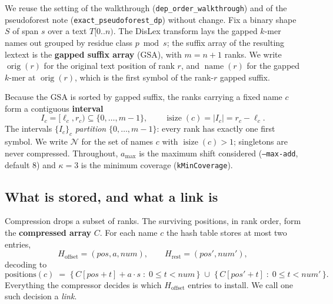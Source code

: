 \documentclass[11pt,a4paper]{article}
\theoremstyle{definition}
\theoremstyle{plain}
\theoremstyle{remark}
\newcommand{\orig}{\operatorname{orig}}
\newcommand{\name}{\operatorname{name}}
\newcommand{\isize}{\operatorname{isize}}
\newcommand{\Names}{\mathcal{N}}
\begin{document}
We reuse the setting of the walkthrough (\texttt{dep\_order\_walkthrough})
and of the pseudoforest note (\texttt{exact\_pseudoforest\_dp}) without
change. Fix a binary shape $S$ of span $s$ over a text $T[0..n)$. The
DisLex transform lays the gapped $k$-mer names out grouped by residue
class $p \bmod s$; the suffix array of the resulting lextext is the
\textbf{gapped suffix array} (GSA), with $m=n+1$ ranks. We write
$\orig(r)$ for the original text position of rank $r$, and $\name(r)$ for
the gapped $k$-mer at $\orig(r)$, which is the first symbol of the
rank-$r$ gapped suffix.

Because the GSA is sorted by gapped suffix, the ranks carrying a fixed
name $c$ form a contiguous \textbf{interval}
\[
  I_c = [\ell_c, r_c) \subseteq \{0,\dots,m-1\},
  \qquad
  \isize(c) = |I_c| = r_c - \ell_c .
\]
The intervals $\{I_c\}_c$ \emph{partition} $\{0,\dots,m-1\}$: every rank
has exactly one first symbol. We write $\Names$ for the set of names $c$
with $\isize(c) > 1$; singletons are never compressed. Throughout,
$a_{\max}$ is the maximum shift considered (\texttt{--max-add}, default
$8$) and $\kappa = 3$ is the minimum coverage
(\texttt{kMinCoverage}).

\subsection{What is stored, and what a link is}

Compression drops a subset of ranks. The surviving positions, in rank
order, form the \textbf{compressed array} $C$. For each name $c$ the hash
table stores at most two entries,
\[
  H_{\mathrm{offset}} = (\mathit{pos}, a, \mathit{num}),
  \qquad
  H_{\mathrm{rest}} = (\mathit{pos}', \mathit{num}'),
\]
decoding to
\begin{equation}
\label{eq:decode}
  \text{positions}(c)
  \;=\;
  \bigl\{\, C[\mathit{pos}+t] + a\cdot s \;:\; 0 \le t < \mathit{num} \,\bigr\}
  \;\cup\;
  \bigl\{\, C[\mathit{pos}'+t] \;:\; 0 \le t < \mathit{num}' \,\bigr\}.
\end{equation}
Everything the compressor decides is which $H_{\mathrm{offset}}$ entries
to install. We call one such decision a \emph{link}.
\end{document}
